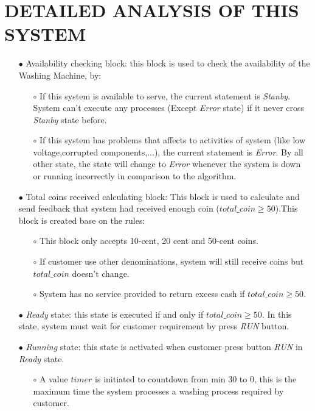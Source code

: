 \documentclass[13pt,a4paper]{article}
\begin{document}
	\section{DETAILED ANALYSIS OF THIS SYSTEM}
	\begin{enumerate}
		\item[$\bullet$] Availability checking block: this block is used to check the availability of the Washing Machine, by: 
			\begin{enumerate}
				\item[$\circ$] If this system is available to serve, the current statement is \textit{Stanby}. System can't execute any processes (Except \textit{Error} state) if it never cross \textit{Stanby} state before.
				\item[$\circ$] If this system has problems that affects to activities of system (like low voltage,corrupted components,...), the current statement is \textit{Error}. By all other state, the state will change to \textit{Error} whenever the system is down or running incorrectly in comparison to the algorithm.
			\end{enumerate}
		\item[$\bullet$] Total coins received calculating block: This block is used to calculate and send feedback that system had received enough coin ($total\_coin \geq 50$).This block is created base on the rules:
			\begin{enumerate}
				\item[$\circ$] This block only accepts 10-cent, 20 cent and 50-cent coins.
				\item[$\circ$] If customer use other denominations, system will still receive coins but $total\_coin$ doesn't change.
				\item[$\circ$] System has no service provided to return excess cash if $total\_coin \geq 50$.
			\end{enumerate}
		\item[$\bullet$] \textit{Ready} state: this state is executed if and only if $total\_coin \geq 50$. In this state, system must wait for customer requirement by press \textit{RUN} button.
		\item[$\bullet$] \textit{Running} state: this state is activated when customer press button \textit{RUN} in \textit{Ready} state. 
			\begin{enumerate}
				\item[$\circ$] A value $timer$ is initiated to countdown from min 30 to 0, this is the maximum time the system processes a washing process required by customer.

\end{enumerate}
\end{enumerate}
\end{document}
